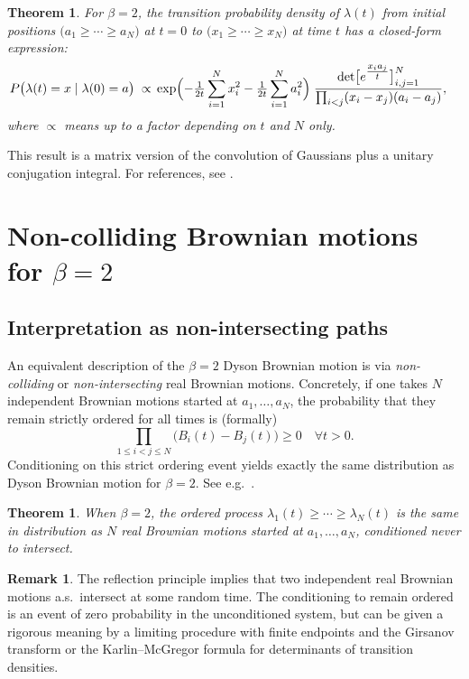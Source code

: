 \documentclass[letterpaper,11pt,oneside,reqno]{article}
\numberwithin{equation}{section}
\newtheorem{theorem}[proposition]{Theorem}
\theoremstyle{definition}
\newtheorem{remark}[proposition]{Remark}
\begin{document}
\begin{theorem}
\label{thm:DBM_transition_beta2}
For $\beta=2$, the transition probability density of $\lambda(t)$ from initial positions $\bigl(a_1\ge \cdots \ge a_N\bigr)$ at $t=0$ to $\bigl(x_1\ge \cdots \ge x_N\bigr)$ at time $t$ has a closed-form expression:
\begin{align*}
P\bigl(\lambda(t)=x\mid \lambda(0)=a\bigr) \;\propto\;
&\exp\Bigl(-\tfrac1{2t}\sum_{i=1}^N x_i^2 - \tfrac1{2t}\sum_{i=1}^N a_i^2\Bigr)\;
\frac{\det\bigl[e^{\tfrac{x_i a_j}{t}}\bigr]_{i,j=1}^N}{\prod_{i<j}(x_i-x_j)(a_i-a_j)},
\end{align*}
where $\propto$ means up to a factor depending on $t$ and $N$ only.
\end{theorem}
This result is a matrix version of the convolution of Gaussians plus a unitary conjugation integral. For references, see \cite{Mehta2004,AndersonGuionnetZeitouni2010,Forrester2010}.

\section{Non-colliding Brownian motions for \texorpdfstring{$\beta=2$}{beta=2}}
\label{sec:noncolliding_BM}

\subsection{Interpretation as non-intersecting paths}
An equivalent description of the $\beta=2$ Dyson Brownian motion is via \emph{non-colliding} or \emph{non-intersecting} real Brownian motions. Concretely, if one takes $N$ independent Brownian motions started at $a_1,\dots,a_N$, the probability that they remain strictly ordered for all times is (formally)
\[
\prod_{1\le i<j\le N}\bigl(B_i(t)-B_j(t)\bigr)\ge0\quad\forall t>0.
\]
Conditioning on this strict ordering event yields exactly the same distribution as Dyson Brownian motion for $\beta=2$. See e.g.\ \cite{Fisher1961,KarlinMcGregor1959,LinstrGesselViennot1985}.

\begin{theorem}
\label{thm:nonintersecting_equivalence}
When $\beta=2$, the ordered process $\lambda_1(t)\ge \cdots \ge \lambda_N(t)$ is the same in distribution as $N$ real Brownian motions started at $a_1,\dots,a_N$, conditioned never to intersect.
\end{theorem}

\begin{remark}
The reflection principle implies that two independent real Brownian motions a.s.\ intersect at some random time. The conditioning to remain ordered is an event of zero probability in the unconditioned system, but can be given a rigorous meaning by a limiting procedure with finite endpoints and the Girsanov transform or the Karlin--McGregor formula for determinants of transition densities.
\end{remark}
\end{document}
